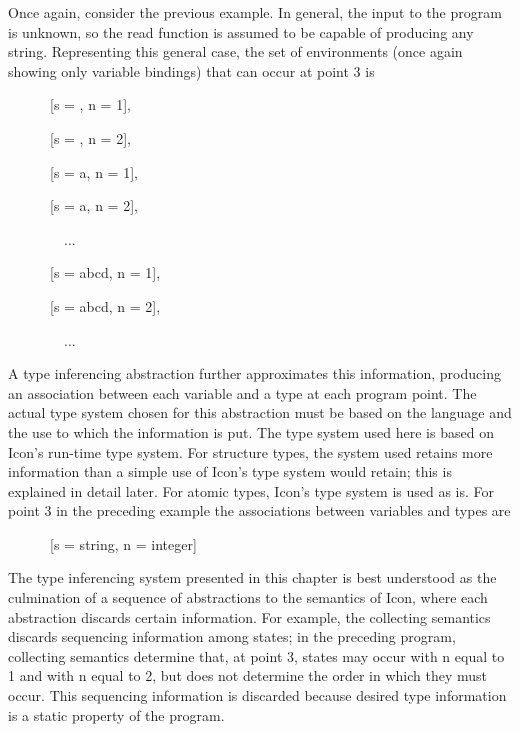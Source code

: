 Once again, consider the previous example. In general, the input to
the program is unknown, so the read function is assumed to be capable
of producing any string. Representing this general case, the set of
environments (once again showing only variable bindings) that can
occur at point 3 is

{\ttfamily\mdseries
\ \ \ \ \ \ [s = {\textquotedbl}{\textquotedbl}, n = 1],}

{\ttfamily\mdseries
\ \ \ \ \ \ [s = {\textquotedbl}{\textquotedbl}, n = 2],}

{\ttfamily\mdseries
\ \ \ \ \ \ [s = {\textquotedbl}a{\textquotedbl}, n = 1],}

{\ttfamily\mdseries
\ \ \ \ \ \ [s = {\textquotedbl}a{\textquotedbl}, n = 2],}

{\ttfamily\mdseries
\ \ \ \ \ \ \ \ ...}

{\ttfamily\mdseries
\ \ \ \ \ \ [s = {\textquotedbl}abcd{\textquotedbl}, n = 1],}

{\ttfamily\mdseries
\ \ \ \ \ \ [s = {\textquotedbl}abcd{\textquotedbl}, n = 2],}

{\ttfamily\mdseries
\ \ \ \ \ \ \ \ ...}


A type inferencing abstraction further approximates this information,
producing an association between each variable and a type at each
program point. The actual type system chosen for this abstraction must
be based on the language and the use to which the information is
put. The type system used here is based on Icon's run-time type
system. For structure types, the system used retains more information
than a simple use of Icon's type system would retain; this is
explained in detail later. For atomic types, Icon's type system is
used as is. For point 3 in the preceding example the associations
between variables and types are

{\ttfamily\mdseries
\ \ \ \ \ \ [s = string, n = integer]}


The type inferencing system presented in this chapter is best
understood as the culmination of a sequence of abstractions to the
semantics of Icon, where each abstraction discards certain
information. For example, the collecting semantics discards sequencing
information among states; in the preceding program, collecting
semantics determine that, at point 3, states may occur with n equal to
1 and with n equal to 2, but does not determine the order in which
they must occur. This sequencing information is discarded because
desired type information is a static property of the program.


